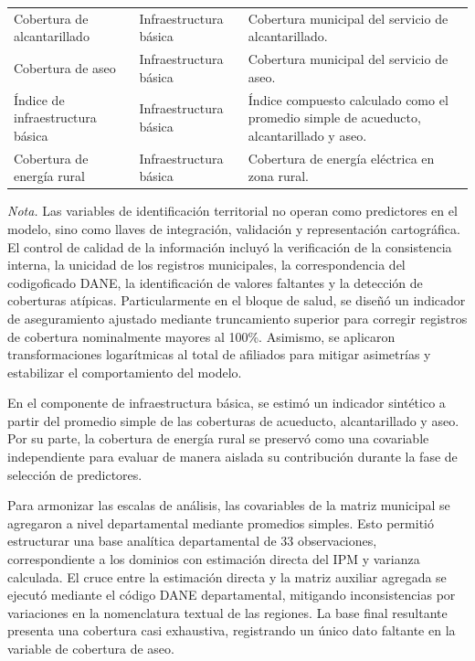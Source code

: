 \begin{table}[H]
\begin{tabular}{p{4.2cm} p{2.6cm} p{6.2cm}}
Cobertura de alcantarillado & Infraestructura básica & Cobertura municipal del servicio de alcantarillado. \\
Cobertura de aseo & Infraestructura básica & Cobertura municipal del servicio de aseo. \\
Índice de infraestructura básica & Infraestructura básica & Índice compuesto calculado como el promedio simple de acueducto, alcantarillado y aseo. \\
Cobertura de energía rural & Infraestructura básica & Cobertura de energía eléctrica en zona rural. \\
\hline
\end{tabular}
\end{table}
\noindent \textit{Nota.} Las variables de identificación territorial no operan como predictores en el modelo, sino como llaves de integración, validación y representación cartográfica. \\

El control de calidad de la información incluyó la verificación de la consistencia interna, la unicidad de los registros municipales, la correspondencia del codigoficado DANE, la identificación de valores faltantes y la detección de coberturas atípicas. Particularmente en el bloque de salud, se diseñó un indicador de aseguramiento ajustado mediante truncamiento superior para corregir registros de cobertura nominalmente mayores al 100\%. Asimismo, se aplicaron transformaciones logarítmicas al total de afiliados para mitigar asimetrías y estabilizar el comportamiento del modelo.

En el componente de infraestructura básica, se estimó un indicador sintético a partir del promedio simple de las coberturas de acueducto, alcantarillado y aseo. Por su parte, la cobertura de energía rural se preservó como una covariable independiente para evaluar de manera aislada su contribución durante la fase de selección de predictores.

Para armonizar las escalas de análisis, las covariables de la matriz municipal se agregaron a nivel departamental mediante promedios simples. Esto permitió estructurar una base analítica departamental de 33 observaciones, correspondiente a los dominios con estimación directa del IPM y varianza calculada. El cruce entre la estimación directa y la matriz auxiliar agregada se ejecutó mediante el código DANE departamental, mitigando inconsistencias por variaciones en la nomenclatura textual de las regiones. La base final resultante presenta una cobertura casi exhaustiva, registrando un único dato faltante en la variable de cobertura de aseo.

